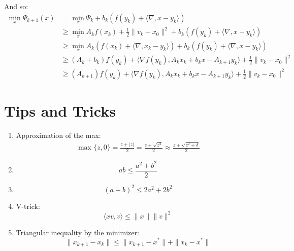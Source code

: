 \documentclass[12pt, openany]{report}
\theoremstyle{definition}
\begin{document}
And so:
\begin{equation}
	\begin{aligned}
		\min_x \Psi_{k+1}(x) &= \min_x \Psi_k + b_k \left( f(y_k)+ \langle \nabla , x-y_k \rangle \right)\\
		&\geq \min_x A_kf(x_k) + \frac{1}{2} \|v_k-x_0\|^2 + b_k \left( f(y_k)+ \langle \nabla , x-y_k \rangle \right)\\
		&\geq \min_x A_k \left( f(x_k) + \langle \nabla , x_k-y_k \rangle \right) + b_k \left( f(y_k)+ \langle \nabla , x-y_k \rangle \right)\\
		&\geq (A_k+b_k) f(y_k) + \langle \nabla f(y_k), A_kx_k+b_kx-A_{k+1}y_k \rangle + \frac{1}{2} \|v_k -x_0\|^2\\
		&\geq (A_{k+1}) f(y_k) + \langle \nabla f(y_k), A_kx_k+b_kx-A_{k+1}y_k \rangle + \frac{1}{2} \|v_k -x_0\|^2
	\end{aligned}
\end{equation}
\chapter{Tips and Tricks}\label{chap:tricks}
\begin{enumerate}
	\item Approximation of the max:
	\begin{equation}\label{eq:approx_max}
		\begin{aligned}
			\max\{z,0\} = \frac{z+|z|}{2} = \frac{z + \sqrt{z^2}}{2} \approx \frac{z + \sqrt{z^2 + \delta}}{2}
		\end{aligned}	
	\end{equation}
	\item \begin{equation}\label{eq:sq1}
		ab \leq \frac{a^2+b^2}{2}	
	\end{equation}
	\item \begin{equation}\label{eq:sq2}
		(a+b)^2 \leq 2a^2+2b^2
	\end{equation}
	\item V-trick:
	\begin{equation}\label{eq:vtrick}
		\langle xv,v\rangle \leq \|x\|\|v\|^2
	\end{equation}
	\item Triangular inequality by the minimizer: 
	\begin{equation}\label{eq:triangular_inequality_by_min}
		\|x_{k+1}-x_k\| \leq \|x_{k+1}-x^*\|+\|x_k-x^*\|
	\end{equation}
\end{enumerate}
\end{document}
